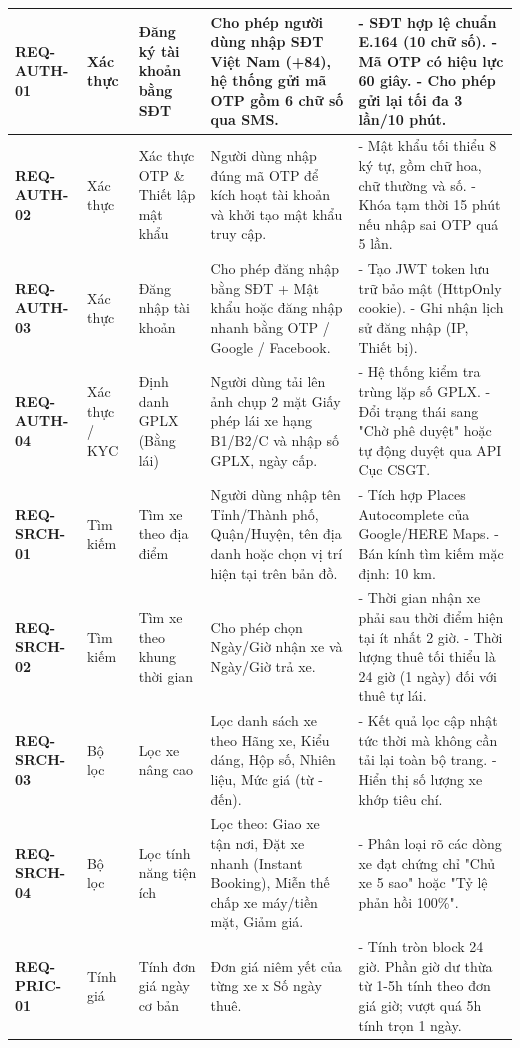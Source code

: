 {\begin{longtable}{p{2.3cm}p{2.2cm}p{2.8cm}p{4.2cm}p{3.8cm}}
\textbf{REQ-AUTH-01} & Xác thực & Đăng ký tài khoản bằng SĐT & Cho phép người dùng nhập SĐT Việt Nam (+84), hệ thống gửi mã OTP gồm 6 chữ số qua SMS. & - SĐT hợp lệ chuẩn E.164 (10 chữ số). - Mã OTP có hiệu lực 60 giây. - Cho phép gửi lại tối đa 3 lần/10 phút. \\ \midrule
\textbf{REQ-AUTH-02} & Xác thực & Xác thực OTP \& Thiết lập mật khẩu & Người dùng nhập đúng mã OTP để kích hoạt tài khoản và khởi tạo mật khẩu truy cập. & - Mật khẩu tối thiểu 8 ký tự, gồm chữ hoa, chữ thường và số. - Khóa tạm thời 15 phút nếu nhập sai OTP quá 5 lần. \\ \midrule
\textbf{REQ-AUTH-03} & Xác thực & Đăng nhập tài khoản & Cho phép đăng nhập bằng SĐT + Mật khẩu hoặc đăng nhập nhanh bằng OTP / Google / Facebook. & - Tạo JWT token lưu trữ bảo mật (HttpOnly cookie). - Ghi nhận lịch sử đăng nhập (IP, Thiết bị). \\ \midrule
\textbf{REQ-AUTH-04} & Xác thực / KYC & Định danh GPLX (Bằng lái) & Người dùng tải lên ảnh chụp 2 mặt Giấy phép lái xe hạng B1/B2/C và nhập số GPLX, ngày cấp. & - Hệ thống kiểm tra trùng lặp số GPLX. - Đổi trạng thái sang "Chờ phê duyệt" hoặc tự động duyệt qua API Cục CSGT. \\ \midrule
\textbf{REQ-SRCH-01} & Tìm kiếm & Tìm xe theo địa điểm & Người dùng nhập tên Tỉnh/Thành phố, Quận/Huyện, tên địa danh hoặc chọn vị trí hiện tại trên bản đồ. & - Tích hợp Places Autocomplete của Google/HERE Maps. - Bán kính tìm kiếm mặc định: 10 km. \\ \midrule
\textbf{REQ-SRCH-02} & Tìm kiếm & Tìm xe theo khung thời gian & Cho phép chọn Ngày/Giờ nhận xe và Ngày/Giờ trả xe. & - Thời gian nhận xe phải sau thời điểm hiện tại ít nhất 2 giờ. - Thời lượng thuê tối thiểu là 24 giờ (1 ngày) đối với thuê tự lái. \\ \midrule
\textbf{REQ-SRCH-03} & Bộ lọc & Lọc xe nâng cao & Lọc danh sách xe theo Hãng xe, Kiểu dáng, Hộp số, Nhiên liệu, Mức giá (từ - đến). & - Kết quả lọc cập nhật tức thời mà không cần tải lại toàn bộ trang. - Hiển thị số lượng xe khớp tiêu chí. \\ \midrule
\textbf{REQ-SRCH-04} & Bộ lọc & Lọc tính năng tiện ích & Lọc theo: Giao xe tận nơi, Đặt xe nhanh (Instant Booking), Miễn thế chấp xe máy/tiền mặt, Giảm giá. & - Phân loại rõ các dòng xe đạt chứng chỉ "Chủ xe 5 sao" hoặc "Tỷ lệ phản hồi 100\%". \\ \midrule
\textbf{REQ-PRIC-01} & Tính giá & Tính đơn giá ngày cơ bản & Đơn giá niêm yết của từng xe x Số ngày thuê. & - Tính tròn block 24 giờ. Phần giờ dư thừa từ 1-5h tính theo đơn giá giờ; vượt quá 5h tính trọn 1 ngày. \\ \midrule

\end{longtable}}
